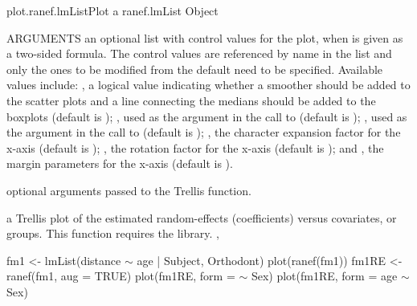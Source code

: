 \documentclass[pdftex]{article} \usepackage{url,graphicx}
\renewcommand{\Twiddle}{\mbox{\(\sim\)}}
\begin{document}
\begin{Helpfile}{plot.ranef.lmList}{Plot a ranef.lmList Object}
\begin{Argument}{ARGUMENTS}
an optional list with control values for the
plot, when  is given as a two-sided formula. The control
values are referenced by name in the  list and  only
the ones to be modified from the default need to be
specified. Available values include: , a logical
value indicating whether a  smoother should be added to
the scatter plots and a line connecting the medians should be added
to the boxplots (default is ); , used
as the  argument in the call to 
(default is ); , used as the
 argument in the call to  (default
is ); , the character expansion factor for
the x-axis (default is ); , the rotation
factor for the x-axis (default is ); and , the
margin parameters for the x-axis (default is ).
\item[\Co{..:}]
optional arguments passed to the Trellis 
function.
\end{Argument}
a Trellis plot of the estimated random-effects (coefficients) versus
covariates, or groups.
This function requires the  library.
, 
\need 15pt
\vspace{-16pt} 
\begin{Example}
fm1 <- lmList(distance {\Twiddle} age | Subject, Orthodont)
plot(ranef(fm1))
fm1RE <- ranef(fm1, aug = TRUE)
plot(fm1RE, form = {\Twiddle} Sex)
plot(fm1RE, form = age {\Twiddle} Sex)
\end{Example}
\end{Helpfile}
\end{document}
